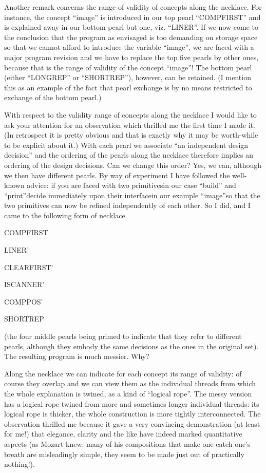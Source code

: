 Another remark concerns the range of validity of concepts along the necklace. For instance, the concept ``image'' is introduced in our top pearl ``COMPFIRST'' and is explained away in our bottom pearl but one, viz. ``LINER''. If we now come to the conclusion that the program as envisaged is too demanding on storage space so that we cannot afford to introduce the variable ``image'', we are faced with a major program revision and we have to replace the top five pearls by other ones, because that is the range of validity of the concept ``image''! The bottom pearl (either ``LONGREP'' or ``SHORTREP''), however, can be retained. (I mention this as an example of the fact that pearl exchange is by no means restricted to exchange of the bottom pearl.)

With respect to the validity range of concepts along the necklace I would like to ask your attention for an observation which thrilled me the first time I made it. (In retrospect it is pretty obvious and that is exactly why it may be worth-while to be explicit about it.) With each pearl we associate ``an independent design decision'' and the ordering of the pearls along the necklace therefore implies an ordering of the design decisions. Can we change this order? Yes, we can, although we then have different pearls. By way of experiment I have followed the well-known advice: if you are faced with two primitives\textemdash{}in our case ``build'' and ``print''\textemdash{}decide immediately upon their interface\textemdash{}in our example ``image''\textemdash{}so that the two primitives can now be refined independently of each other. So I did, and I came to the following form of necklace

COMPFIRST

LINER'

CLEARFIRST'

ISCANNER'

COMPPOS'

SHORTREP

\noindent
(the four middle pearls being primed to indicate that they refer to different pearls, although they embody the same decisions as the ones in the original set). The resulting program is much messier. Why?

Along the necklace we can indicate for each concept its range of validity: of course they overlap and we can view them as the individual threads from which the whole explanation is twined, as a kind of ``logical rope''. The messy version has a logical rope twined from more and sometimes longer individual threads: its logical rope is thicker, the whole construction is more tightly interconnected. The observation thrilled me because it gave a very convincing demonstration (at least for me!) that elegance, clarity and the like have indeed marked quantitative aspects (as Mozart knew: many of his compositions that make one catch one's breath are misleadingly simple, they seem to be made just out of practically nothing!).

